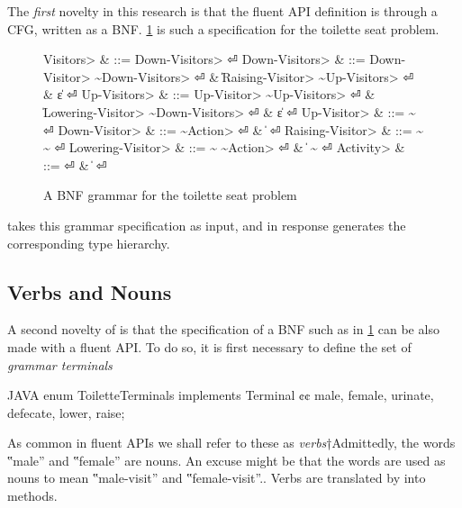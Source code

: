 The \emph{first} novelty in this research is that the fluent API definition is
  through a CFG, written as a BNF.
\cref{figure:BNF} is such a specification for the toilette seat problem.

\begin{figure}[H]
  \begin{Grammar}
    \begin{aligned}
      \<Visitors> & ::= \<Down-Visitors> \hfill⏎
      \<Down-Visitors> & ::= \<Down-Visitor> \~\<Down-Visitors> \hfill⏎
      {} & \| \<Raising-Visitor> \~\<Up-Visitors> \hfill⏎
      {} & \| ε \hfill⏎
      \<Up-Visitors> & ::= \<Up-Visitor> \~\<Up-Visitors> \hfill⏎
      {} & \| \<Lowering-Visitor> \~\<Down-Visitors> \hfill⏎
      {} & \| ε \hfill⏎
      \<Up-Visitor> & ::=  \~ \hfill⏎
      \<Down-Visitor> & ::=  \~\<Action> \hfill⏎
                          & \|   \hfill⏎
      \<Raising-Visitor> & ::=  \~ \~ \hfill⏎
      \<Lowering-Visitor> & ::=  \~ \~\<Action> \hfill⏎
                          & \|  \~  \hfill⏎
      \<Activity> & ::=  \hfill⏎
                          & \|  \hfill⏎
    \end{aligned}
  \end{Grammar}
  \caption{A BNF grammar for the toilette seat problem}
  \label{figure:BNF}
\end{figure}

\Self takes this grammar specification as input, and in response
  generates the corresponding
  \Java type hierarchy.

\subsection{Verbs and Nouns}
A second novelty of \Self is that the specification of a BNF such as in
  \cref{figure:BNF} can be also made with a \Java fluent API\@.
To do so, it is first necessary to
  define the set of \emph{grammar terminals}
  \begin{code}{JAVA}
enum ToiletteTerminals implements Terminal {¢¢
  male, female,
  urinate, defecate,
  lower, raise;
}
\end{code}
As common in fluent APIs we shall refer to these
as \emph{verbs}†{Admittedly, the words ‟male” and ‟female” are nouns.
  An excuse might be that the words are used as nouns to mean ‟male-visit” and ‟female-visit”.}.
Verbs are translated by \Self into methods.

